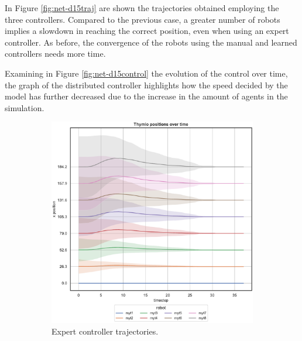 In Figure \ref{fig:net-d15traj} are shown the trajectories obtained employing 
the three controllers. 
Compared to the previous case, a greater number of robots implies a 
slowdown in reaching the correct position, even when using an expert 
controller.
As before, the convergence of the robots using the manual and learned 
controllers needs more time.

Examining in Figure \ref{fig:net-d15control} the evolution of the control over 
time, the graph of the distributed controller highlights how the speed decided by 
the model has further decreased due to the increase in the amount of agents in 
the simulation.

\begin{figure}[!htb]
	\begin{center}
		\begin{subfigure}[h]{0.49\textwidth}
			\centering
			\includegraphics[width=.9\textwidth]{contents/images/net-d15/position-overtime-omniscient}%
			\caption{Expert controller trajectories.}
		\end{subfigure}
		\hfill
		\begin{subfigure}[h]{0.49\textwidth}
			\centering

\end{subfigure}
\end{center}
\end{figure}
